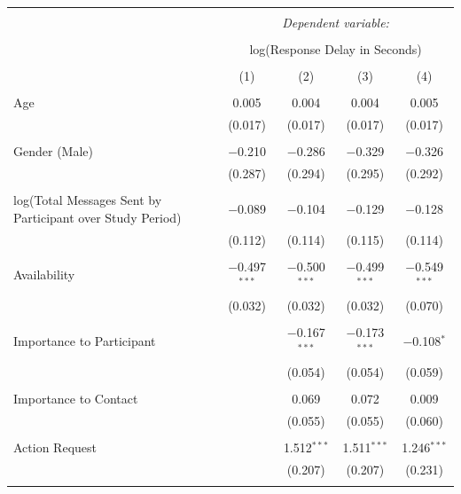 \documentclass[12pt]{nuthesis}	%
\begin{document}
\begin{table}[!htbp] \fontsize{7}{7.2}\selectfont \centering 
\begin{tabular}{@{\extracolsep{5pt}}lcccc} 
\\[-1.8ex]\hline 
\hline \\[-1.8ex] 
 & \multicolumn{4}{c}{\textit{Dependent variable:}} \\ 
\cline{2-5} 
\\[-1.8ex] & \multicolumn{4}{c}{log(Response Delay in Seconds)} \\ 
\\[-1.8ex] & (1) & (2) & (3) & (4)\\ 
\hline \\[-1.8ex] 
 Age & 0.005 & 0.004 & 0.004 & 0.005 \\ 
  & (0.017) & (0.017) & (0.017) & (0.017) \\ 
  & & & & \\ 
 Gender (Male) & $-$0.210 & $-$0.286 & $-$0.329 & $-$0.326 \\ 
  & (0.287) & (0.294) & (0.295) & (0.292) \\ 
  & & & & \\ 
 log(Total Messages Sent by Participant over Study Period) & $-$0.089 & $-$0.104 & $-$0.129 & $-$0.128 \\ 
  & (0.112) & (0.114) & (0.115) & (0.114) \\ 
  & & & & \\ 
 Availability & $-$0.497$^{***}$ & $-$0.500$^{***}$ & $-$0.499$^{***}$ & $-$0.549$^{***}$ \\ 
  & (0.032) & (0.032) & (0.032) & (0.070) \\ 
  & & & & \\ 
 Importance to Participant &  & $-$0.167$^{***}$ & $-$0.173$^{***}$ & $-$0.108$^{*}$ \\ 
  &  & (0.054) & (0.054) & (0.059) \\ 
  & & & & \\ 
 Importance to Contact &  & 0.069 & 0.072 & 0.009 \\ 
  &  & (0.055) & (0.055) & (0.060) \\ 
  & & & & \\ 
 Action Request &  & 1.512$^{***}$ & 1.511$^{***}$ & 1.246$^{***}$ \\ 
  &  & (0.207) & (0.207) & (0.231) \\ 
  & & & & \\ 

\end{tabular}
\end{table}
\end{document}
